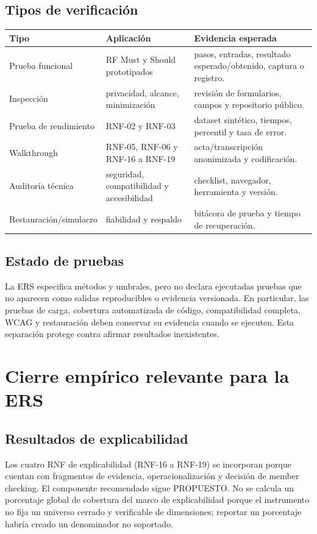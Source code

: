 \documentclass[11pt,a4paper,twoside]{article}
\begin{document}
\subsection{Tipos de verificación}
\begin{tabularx}{\textwidth}{p{3.7cm}p{3.6cm}X}\toprule
Tipo & Aplicación & Evidencia esperada \\ \midrule
Prueba funcional & RF Must y Should prototipados & pasos, entradas, resultado esperado/obtenido, captura o registro.\\
Inspección & privacidad, alcance, minimización & revisión de formularios, campos y repositorio público.\\
Prueba de rendimiento & RNF-02 y RNF-03 & dataset sintético, tiempos, percentil y tasa de error.\\
Walkthrough & RNF-05, RNF-06 y RNF-16 a RNF-19 & acta/transcripción anonimizada y codificación.\\
Auditoría técnica & seguridad, compatibilidad y accesibilidad & checklist, navegador, herramienta y versión.\\
Restauración/simulacro & fiabilidad y respaldo & bitácora de prueba y tiempo de recuperación.\\
\bottomrule\end{tabularx}

\subsection{Estado de pruebas}
La ERS especifica métodos y umbrales, pero no declara ejecutadas pruebas que no aparecen como salidas reproducibles o evidencia versionada. En particular, las pruebas de carga, cobertura automatizada de código, compatibilidad completa, WCAG y restauración deben conservar su evidencia cuando se ejecuten. Esta separación protege contra afirmar resultados inexistentes.

\section{Cierre empírico relevante para la ERS}
\subsection{Resultados de explicabilidad}
Los cuatro RNF de explicabilidad (RNF-16 a RNF-19) se incorporan porque cuentan con fragmentos de evidencia, operacionalización y decisión de member checking. El componente recomendado sigue PROPUESTO. No se calcula un porcentaje global de cobertura del marco de explicabilidad porque el instrumento no fija un universo cerrado y verificable de dimensiones; reportar un porcentaje habría creado un denominador no soportado.
\end{document}
